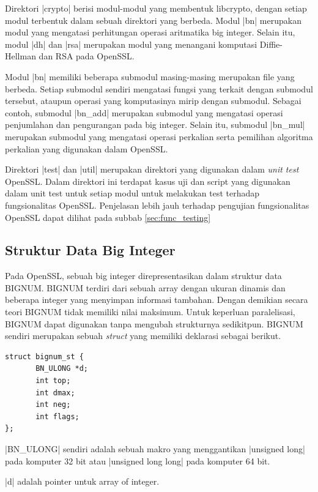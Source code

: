     Direktori |crypto| berisi modul-modul yang membentuk libcrypto, dengan setiap modul terbentuk dalam sebuah direktori yang berbeda. Modul |bn| merupakan modul yang mengatasi perhitungan operasi aritmatika big integer. Selain itu, modul |dh| dan |rsa| merupakan modul yang menangani komputasi Diffie-Hellman dan RSA pada OpenSSL.

    Modul |bn| memiliki beberapa submodul masing-masing merupakan file yang berbeda. Setiap submodul sendiri mengatasi fungsi yang terkait dengan submodul tersebut, ataupun operasi yang komputasinya mirip dengan submodul. Sebagai contoh, submodul |bn_add| merupakan submodul yang mengatasi operasi penjumlahan dan pengurangan pada big integer. Selain itu, submodul |bn_mul| merupakan submodul yang mengatasi operasi perkalian serta pemilihan algoritma perkalian yang digunakan dalam OpenSSL.

    Direktori |test| dan |util| merupakan direktori yang digunakan dalam \textit{unit test} OpenSSL. Dalam direktori ini terdapat kasus uji dan script yang digunakan dalam unit test untuk setiap modul untuk melakukan test terhadap fungsionalitas OpenSSL. Penjelasan lebih jauh terhadap pengujian fungsionalitas OpenSSL dapat dilihat pada subbab \ref{sec:func_testing}

  \subsection{Struktur Data Big Integer} \label{sec:bignum_struct}
    Pada OpenSSL, sebuah big integer direpresentasikan dalam struktur data BIGNUM. BIGNUM terdiri dari sebuah array dengan ukuran dinamis dan beberapa integer yang menyimpan informasi tambahan. Dengan demikian secara teori BIGNUM tidak memiliki nilai maksimum. Untuk keperluan paralelisasi, BIGNUM dapat digunakan tanpa mengubah strukturnya sedikitpun. BIGNUM sendiri merupakan sebuah \textit{struct} yang memiliki deklarasi sebagai berikut.

    \begin{lstlisting}[caption=Struktur Data bignum]
struct bignum_st {
       BN_ULONG *d;
       int top;
       int dmax;
       int neg;
       int flags;
};
\end{lstlisting}

    |BN_ULONG| sendiri adalah sebuah makro yang menggantikan |unsigned long| pada komputer 32 bit atau |unsigned long long| pada komputer 64 bit.

    |d| adalah pointer untuk array of integer.

